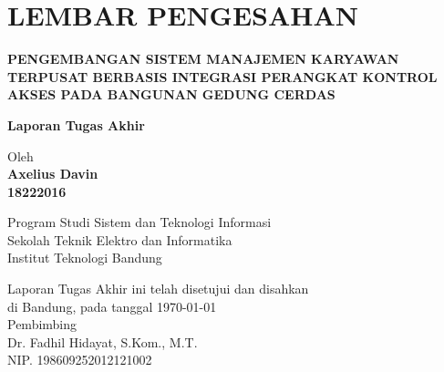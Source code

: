 \chapter*{LEMBAR PENGESAHAN}


\begin{center}
    \vspace{2cm}
  {\large\bfseries PENGEMBANGAN SISTEM MANAJEMEN KARYAWAN TERPUSAT BERBASIS INTEGRASI PERANGKAT KONTROL AKSES PADA BANGUNAN GEDUNG CERDAS}\\
    \vspace{2cm}

  {\Large \textbf{Laporan Tugas Akhir}}\\


  \vspace{1.5cm}
    
    
  {\large Oleh}\\[0.3cm]
    \textbf{
    {\large Axelius Davin}\\
    {\large 18222016}
  }\\
    
  \vspace{0.5cm}
 
  {\large Program Studi Sistem dan Teknologi Informasi}\\
  {\large Sekolah Teknik Elektro dan Informatika}\\
  {\large Institut Teknologi Bandung}\\

  \vspace{1.5cm}

  Laporan Tugas Akhir ini telah disetujui dan disahkan\\ 
  di Bandung, pada tanggal \today\\[1cm]

	Pembimbing  \\[3cm]
	Dr. Fadhil Hidayat, S.Kom., M.T.   \\[0.2cm]
	NIP. 198609252012121002 

\end{center}

\vspace{1cm}
\noindent



